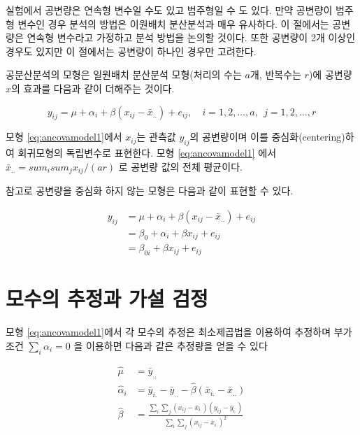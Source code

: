 \documentclass[
]{book}
\begin{document}
실험에서 공변량은 연속형 변수일 수도 있고 범주형일 수 도 있다. 만약 공변량이 범주형 변수인 경우 분석의 방법은 이원배치 분산분석과 매우 유사하다. 이 절에서는 공변량은 연속형 변수라고 가정하고 분석 방법을 논의할 것이다. 또한 공변량이 2개 이상인 경우도 있지만 이 절에서는 공변량이 하나인 경우만 고려한다.

공분산분석의 모형은 일원배치 분산분석 모형(처리의 수는 \(a\)개, 반복수는 \(r\))에 공변량 \(x\)의 효과를 다음과 같이 더해주는 것이다.

\begin{equation} 
y_{ij} = \mu + \alpha_i + \beta(x_{ij} - \bar x_{..}) + e_{ij}, 
\quad i=1,2,\dots,a, ~~ j=1,2,\dots,r
\label{eq:ancovamodel1}
\end{equation}

모형 \eqref{eq:ancovamodel1}에서 \(x_{ij}\)는 관측값 \(y_{ij}\)의 공변량이며 이를 중심화(centering)하여 회귀모형의 독립변수로 표현한다. 모형 \eqref{eq:ancovamodel1} 에서 \(\bar x_{..} = sum_i sum_j x_{ij}/(ar)\) 로 공변량 값의 전체 평균이다.

참고로 공변량을 중심화 하지 않는 모형은 다음과 같이 표현할 수 있다.

\begin{align*}
y_{ij} & = \mu + \alpha_i + \beta(x_{ij} - \bar x_{..}) + e_{ij} \\
  & = \beta_0 + \alpha_i + \beta x_{ij} + e_{ij} \\
  & = \beta_{0i} + \beta x_{ij} + e_{ij}
\end{align*}

\hypertarget{uxbaa8uxc218uxc758-uxcd94uxc815uxacfc-uxac00uxc124-uxac80uxc815}{%
\section{모수의 추정과 가설 검정}\label{uxbaa8uxc218uxc758-uxcd94uxc815uxacfc-uxac00uxc124-uxac80uxc815}}

모형 \eqref{eq:ancovamodel1}에서 각 모수의 추정은 최소제곱법을 이용하여 추정하며 부가조건 \(\sum_i \alpha_i =0\) 을 이용하면 다음과 같은 추정량을 얻을 수 있다

\begin{align*}
\hat \mu & = \bar y_{..} \\
\hat \alpha_i & =\bar y_{i.} - \bar y_{..} -\hat \beta(\bar x_{i.} -\bar x_{..}) \\
\hat \beta & =  \frac{ \sum_i \sum_j (x_{ij} - \bar x_{i.})(y_{ij}-\bar y_{i.})}{\sum_i \sum_j (x_{ij} - \bar x_{i.})^2}
\end{align*}
\end{document}
